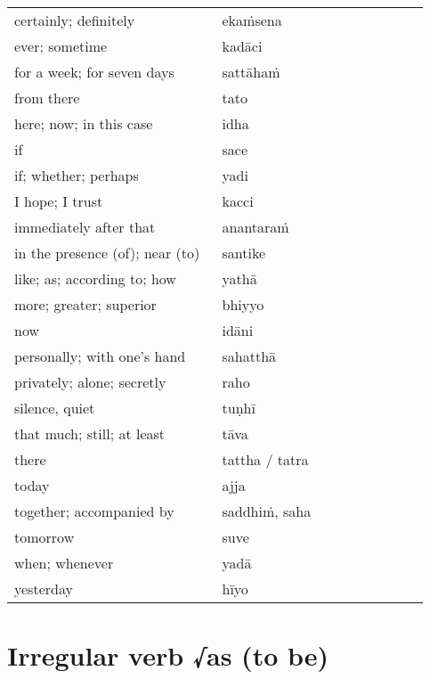 \documentclass[a4paper]{memoir}
\begin{document}
\begin{multicols}{2}
\columnbreak

\begin{center}
\begin{tabular}{L{0.48\linewidth} L{0.48\linewidth}}
certainly; definitely & ekaṁsena\\[0pt]
ever; sometime & kadāci\\[0pt]
for a week; for seven days & sattāhaṁ\\[0pt]
from there & tato\\[0pt]
here; now; in this case & idha\\[0pt]
if & sace\\[0pt]
if; whether; perhaps & yadi\\[0pt]
I hope; I trust & kacci\\[0pt]
immediately after that & anantaraṁ\\[0pt]
in the presence (of); near (to) & santike\\[0pt]
like; as; according to; how & yathā\\[0pt]
more; greater; superior & bhiyyo\\[0pt]
now & idāni\\[0pt]
personally; with one's hand & sahatthā\\[0pt]
privately; alone; secretly & raho\\[0pt]
silence, quiet & tuṇhī\\[0pt]
that much; still; at least & tāva\\[0pt]
there & tattha / tatra\\[0pt]
today & ajja\\[0pt]
together; accompanied by & saddhiṁ, saha\\[0pt]
tomorrow & suve\\[0pt]
when; whenever & yadā\\[0pt]
yesterday & hīyo\\[0pt]
\end{tabular}
\end{center}

\end{multicols}

\clearpage

\section{Irregular verb √as (to be)}
\label{sec:org1c7c4b4}
\end{document}
